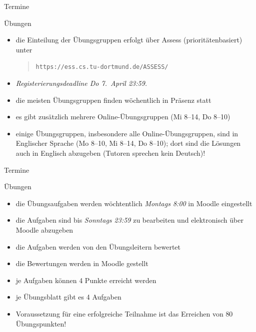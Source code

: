\documentclass[aspectratio=1610, 11pt]{beamer}
\begin{document}
%
%
%

\begin{frame}{Termine}
	\begin{exampleblock}{\"Ubungen}
		\begin{itemize}
			\item die Einteilung der \"Ubungsgruppen erfolgt \"uber Assess (priorit\"atenbasiert) unter
				\begin{quote}
\tt https://ess.cs.tu-dortmund.de/ASSESS/
				\end{quote}
			\item \emph{Registerierungsdeadline Do 7.~April 23:59.}
			\item die meisten \"Ubungsgruppen finden w\"ochentlich \alert{in Pr\"asenz} statt
			\item es gibt zus\"atzlich mehrere \alert{Online-\"Ubungsgruppen} (Mi 8--14, Do 8--10)
			\item einige \"Ubungsgruppen, insbesondere alle Online-\"Ubungsgruppen, sind in \alert{Englischer Sprache} (Mo 8--10, Mi 8--14, Do 8--10); dort sind die L\"osungen auch in Englisch abzugeben (Tutoren sprechen kein Deutsch)!
		\end{itemize}
	\end{exampleblock}
\end{frame}

\begin{frame}{Termine}
	\begin{exampleblock}{\"Ubungen}
		\begin{itemize}
			\item die \"Ubungsaufgaben werden w\"ochtentlich \emph{Montags 8:00} in Moodle eingestellt
			\item die Aufgaben sind bis \emph{Sonntags 23:59} zu bearbeiten und elektronisch \"uber Moodle abzugeben
			\item die Aufgaben werden von den \"Ubungsleitern bewertet
			\item die Bewertungen werden in Moodle gestellt
			\item je Aufgaben k\"onnen 4 Punkte erreicht werden
			\item je \"Ubungsblatt gibt es 4 Aufgaben
			\item Voraussetzung f\"ur eine erfolgreiche Teilnahme ist das Erreichen von \alert{80 \"Ubungspunkten!}
		\end{itemize}
	\end{exampleblock}
\end{frame}
\end{document}
